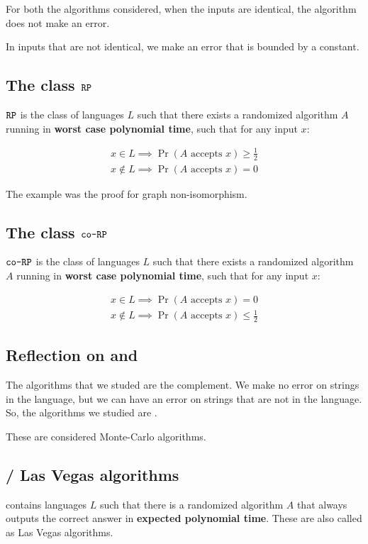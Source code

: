 For both the algorithms considered, when the inputs are identical, the
algorithm does not make an error.

In inputs that are not identical, we make an error that is bounded by a
constant.

\subsection{The class $\texttt{RP}$}
$\texttt{RP}$ is the class of languages $L$ such that there exists a randomized
algorithm $A$ running in \textbf{worst case polynomial time}, such that for any input
$x$:

\begin{align*}
x \in L \implies \Pr(\text{$A$ accepts $x$}) \geq \frac{1}{2} \\
x \notin L \implies \Pr(\text{$A$ accepts $x$}) = 0
\end{align*}

The example was the \ip proof for graph non-isomorphism.


\subsection{The class $\texttt{co-RP}$}
$\texttt{co-RP}$ is the class of languages $L$ such that there exists a randomized
algorithm $A$ running in \textbf{worst case polynomial time}, such that for any input
$x$:

\begin{align*}
x \in L \implies \Pr(\text{$A$ accepts $x$})  = 0 \\
x \notin L \implies \Pr(\text{$A$ accepts $x$}) \leq \frac{1}{2}
\end{align*}


\subsection{Reflection on \rp and \corp}

The algorithms that we studed are the complement. We make no error
on strings in the language, but we can have an error on strings that are 
not in the language. So, the algorithms we studied are \corp.

These are considered Monte-Carlo algorithms.


\subsection{\zp / Las Vegas algorithms}
\zp contains languages $L$ such that there is a randomized algorithm $A$
that always outputs the correct answer in \textbf{expected polynomial time}.  
These are also called as Las Vegas algorithms.



